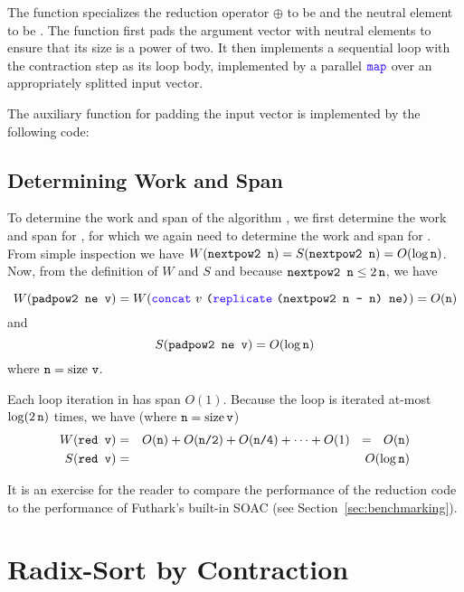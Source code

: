 \documentclass[oneside,11pt]{book}
\newcommand{\size}{\ensuremath{\mathrm{size}}}
\renewcommand{\log}{\ensuremath{\mathrm{log}}}
\newenvironment{wrap}{\vspace{\topskip}\par\noindent\begin{minipage}{\linewidth}}{\end{minipage}\par}
\begin{document}
\begin{wrap}

\end{wrap}

\noindent
The function specializes the reduction operator $\oplus$ to be \kw{+}
and the neutral element to be . The function first pads the
argument vector  with neutral elements to ensure that its size
is a power of two. It then implements a sequential loop with the
contraction step as its loop body, implemented by a
parallel $\fop{map}$ over an appropriately splitted input vector.

The auxiliary function for padding the input vector is implemented by
the following code:

\begin{wrap}

\end{wrap}

\subsection{Determining Work and Span}

To determine the work and span of the algorithm , we first
determine the work and span for , for which we again need
to determine the work and span for . From simple
inspection we have $W(\texttt{nextpow2 n}) = S(\texttt{nextpow2 n}) =
O(\mathrm{log}\,\texttt{n})$. Now, from the definition of $W$ and $S$ and
because $\texttt{nextpow2 n} \leq 2\,\texttt{n}$, we have

$$W(\kw{padpow2 ne v}) = W(\fop{concat}~v~\kw{(}\fop{replicate}~\kw{(nextpow2 n - n) ne)}) = O(\kw{n})$$
and
$$S(\kw{padpow2 ne v}) = O(\log\,\kw{n})$$
where $\kw{n} = \size~\kw{v}$.

Each loop iteration in  has span $O(1)$. Because the loop is
iterated at-most $\log(2\,\kw{n})$ times, we have (where $\kw{n} =
\size\,\kw{v}$)
\begin{eqnarray*}
  W(\kw{red v}) & = & O(\kw{n}) + O(\kw{n/2}) + O(\kw{n/4}) + \cdots + O(1) ~~=~~ O(\kw{n}) \\
  S(\kw{red v}) & = & O(\log\,\kw{n})
\end{eqnarray*}

It is an exercise for the reader to compare the performance of the
reduction code to the performance of Futhark's built-in 
SOAC (see Section~\ref{sec:benchmarking}).

\section{Radix-Sort by Contraction}
\end{document}
